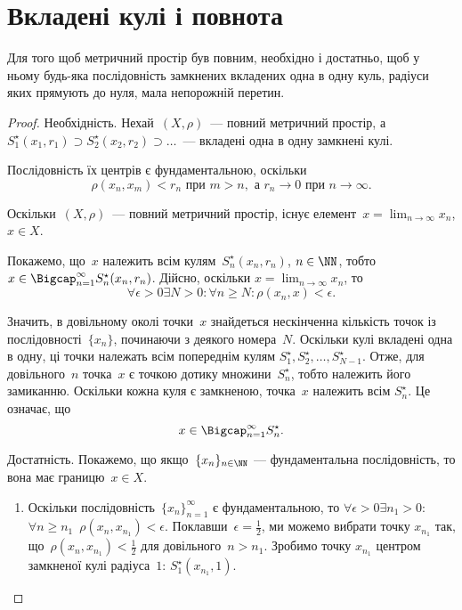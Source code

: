 \section{Вкладені кулі і повнота}

\begin{theorem}
 Для того щоб
метричний простір був повним, необхідно і достатньо, щоб
у ньому будь-яка послідовність замкнених вкладених одна в
одну куль, радіуси яких прямують до нуля, мала непорожній
перетин.
\end{theorem}

\begin{proof}
Необхідність. Нехай~$(X, \rho)$~--- повний
метричний простір, а~$S_1^\star(x_1, r_1) \supset S_2^\star(x_2, r_2) \supset \dots$~--- вкладені
одна в одну замкнені кулі.

Послідовність їх центрів є фундаментальною, оскільки
\begin{equation*}
    \rho(x_n, x_m) < r_n \text{ при } m > n, \text{ а } r_n \to 0 \text{ при } n \to \infty.
\end{equation*}

Оскільки~$(X, \rho)$~--- повний метричний простір, існує
елемент~$x = \lim_{n \to \infty} x_n$, $x \in X$.

Покажемо, що~$x$ належить всім кулям~$S_n^\star(x_n, r_n)$, $n \in \NN$,
тобто~$x \in \Bigcap_{n = 1}^\infty S_n^\star(x_n, r_n)$. Дійсно, оскільки
$x = \lim_{n \to \infty} x_n$, то
\begin{equation*}
    \forall \epsilon > 0 \exists N > 0: \forall n \ge N: \rho(x_n, x) < \epsilon.    
\end{equation*}

Значить, в довільному околі точки~$x$ знайдеться
нескінченна кількість точок із послідовності~$\{x_n\}$,
починаючи з деякого номера~$N$. Оскільки кулі вкладені
одна в одну, ці точки належать всім попереднім кулям
$S_1^\star, S_2^\star, \dots, S_{N - 1}^\star$.
Отже, для довільного~$n$ точка~$x$ є точкою
дотику множини~$S_n^\star$, тобто належить його замиканню.
Оскільки кожна куля є замкненою, точка~$x$ належить всім
$S_n^\star$. Це означає, що
\begin{equation*}
    x \in \Bigcap_{n = 1}^\infty S_n^\star.
\end{equation*}

Достатність. Покажемо, що якщо~$\{x_n\}_{n \in \NN}$ ---
фундаментальна послідовність, то вона має границю~$x \in X$.

\begin{enumerate}
\item Оскільки послідовність~$\{x_n\}_{n = 1}^\infty$ є фундаментальною, то
$\forall \epsilon > 0 \exists n_1 > 0$:
$\forall n \ge n_1$~$\rho(x_n, x_{n_1}) < \epsilon$.
Поклавши~$\epsilon = \frac{1}{2}$, ми можемо вибрати точку
$x_{n_1}$ так, що~$\rho(x_n, x_{n_1}) < \frac{1}{2}$ для
довільного~$n > n_1$. Зробимо точку
$x_{n_1}$ центром замкненої кулі радіуса~$1$: 
$S_1^\star(x_{n_1}, 1)$.


\end{enumerate}
\end{proof}
